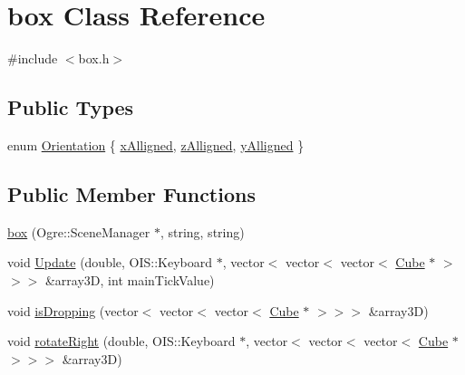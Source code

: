 \hypertarget{classbox}{\section{box Class Reference}
\label{classbox}
}


{\ttfamily \#include $<$box.\-h$>$}

\subsection*{Public Types}
\begin{DoxyCompactItemize}
\item 
enum \hyperlink{classbox_a9cfa5b85cd77bd929b7611f5823fa3ba}{Orientation} \{ \hyperlink{classbox_a9cfa5b85cd77bd929b7611f5823fa3baa7c8d5f8365e0ee32bee3827910697355}{x\-Alligned}, 
\hyperlink{classbox_a9cfa5b85cd77bd929b7611f5823fa3baab2cff0f5e8ace5ef979213e7091a7523}{z\-Alligned}, 
\hyperlink{classbox_a9cfa5b85cd77bd929b7611f5823fa3baa598289cd38376f8f57691c61a030f41d}{y\-Alligned}
 \}
\end{DoxyCompactItemize}
\subsection*{Public Member Functions}
\begin{DoxyCompactItemize}
\item 
\hyperlink{classbox_a4a8fad0047fb04ef2fb2d7d0f18e7ff0}{box} (Ogre\-::\-Scene\-Manager $\ast$, string, string)
\item 
void \hyperlink{classbox_ad508ff824e4e7bc12f318e04d6261ca7}{Update} (double, O\-I\-S\-::\-Keyboard $\ast$, vector$<$ vector$<$ vector$<$ \hyperlink{class_cube}{Cube} $\ast$ $>$$>$$>$ \&array3\-D, int main\-Tick\-Value)
\item 
void \hyperlink{classbox_a8a65009f32aea940426dddaa8acc0f2c}{is\-Dropping} (vector$<$ vector$<$ vector$<$ \hyperlink{class_cube}{Cube} $\ast$ $>$$>$$>$ \&array3\-D)
\item 
void \hyperlink{classbox_a942225e95b59248056c66ab7cfb6169c}{rotate\-Right} (double, O\-I\-S\-::\-Keyboard $\ast$, vector$<$ vector$<$ vector$<$ \hyperlink{class_cube}{Cube} $\ast$ $>$$>$$>$ \&array3\-D)
\end{DoxyCompactItemize}

